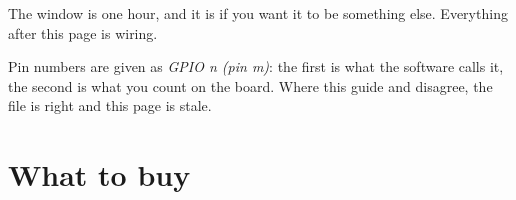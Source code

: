 \documentclass[11pt]{article}
\begin{document}
\vspace{1mm}
\noindent The window is one hour, and it is  if you want it
to be something else. Everything after this page is wiring.

\vspace{4mm}
\noindent\footnotesize\color{ink70}
Pin numbers are given as \emph{GPIO n (pin m)}: the first is what the software
calls it, the second is what you count on the board. Where this guide and
 disagree, the file is right and this page is
stale.
\normalsize\color{ink}

\clearpage

\section{What to buy}
\end{document}
